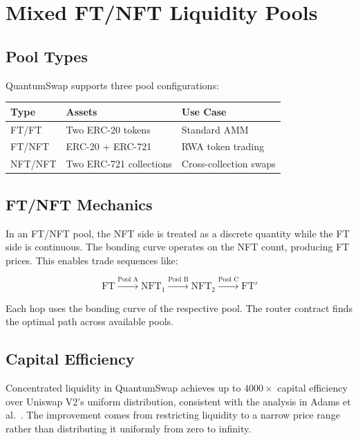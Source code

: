 \documentclass[11pt,a4paper]{article}
\begin{document}
\section{Mixed FT/NFT Liquidity Pools}

\subsection{Pool Types}

QuantumSwap supports three pool configurations:

\begin{center}
\begin{tabular}{lll}
\toprule
\textbf{Type} & \textbf{Assets} & \textbf{Use Case} \\
\midrule
FT/FT & Two ERC-20 tokens & Standard AMM \\
FT/NFT & ERC-20 + ERC-721 & RWA token trading \\
NFT/NFT & Two ERC-721 collections & Cross-collection swaps \\
\bottomrule
\end{tabular}
\end{center}

\subsection{FT/NFT Mechanics}

In an FT/NFT pool, the NFT side is treated as a discrete quantity
while the FT side is continuous. The bonding curve operates on the
NFT count, producing FT prices. This enables trade sequences like:

\[
\text{FT} \xrightarrow{\text{Pool A}} \text{NFT}_1
\xrightarrow{\text{Pool B}} \text{NFT}_2
\xrightarrow{\text{Pool C}} \text{FT}'
\]

Each hop uses the bonding curve of the respective pool. The router
contract finds the optimal path across available pools.

\subsection{Capital Efficiency}

Concentrated liquidity in QuantumSwap achieves up to $4000\times$
capital efficiency over Uniswap V2's uniform distribution, consistent
with the analysis in Adams et al.~\cite{uniswapv3}. The improvement
comes from restricting liquidity to a narrow price range rather than
distributing it uniformly from zero to infinity.
\end{document}
